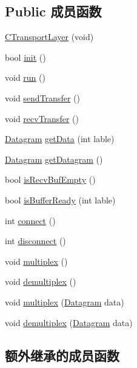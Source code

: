 \subsection*{Public 成员函数}
\begin{DoxyCompactItemize}
\item 
\hyperlink{class_c_transport_layer_ac28ec2550ebfcb876e31264f65d1e8d6}{C\+Transport\+Layer} (void)
\item 
bool \hyperlink{class_c_transport_layer_ac81e9405db824a73a6092ed0b05a217b}{init} ()
\item 
void \hyperlink{class_c_transport_layer_a60d1d41f33c5662eb9c1bbd1c8aa4dc3}{run} ()
\item 
void \hyperlink{class_c_transport_layer_a5755c5d7f4158bb08303b98042b24ca1}{send\+Transfer} ()
\item 
void \hyperlink{class_c_transport_layer_ad30133ccd6047d127d5a9feec593877d}{recv\+Transfer} ()
\item 
\hyperlink{class_datagram}{Datagram} \hyperlink{class_c_transport_layer_a9396850eb026ff070c06bfc25dd4979c}{get\+Data} (int lable)
\item 
\hyperlink{class_datagram}{Datagram} \hyperlink{class_c_transport_layer_a6ee36bbbfab91014087ed88923129372}{get\+Datagram} ()
\item 
bool \hyperlink{class_c_transport_layer_a18cba0784dba2a15f051be2c1163c278}{is\+Recv\+Buf\+Empty} ()
\item 
bool \hyperlink{class_c_transport_layer_aace17995c3cff74c756ecdb2a2e8cf43}{is\+Buffer\+Ready} (int lable)
\item 
int \hyperlink{class_c_transport_layer_a5830c0965a4a9501ffb33ae8d2acb58b}{connect} ()
\item 
int \hyperlink{class_c_transport_layer_a603dcfda4b1ef7dfb58c922cd8fd59bb}{disconnect} ()
\item 
void \hyperlink{class_c_transport_layer_abce8f3ca4b9c4d5c957b0f7b6746f289}{multiplex} ()
\item 
void \hyperlink{class_c_transport_layer_a3cbec0cdcdcf91df91ae7c708d8a414c}{demultiplex} ()
\item 
void \hyperlink{class_c_transport_layer_aa5d4c185f3a0f9c968d51caf46f7332e}{multiplex} (\hyperlink{class_datagram}{Datagram} data)
\item 
void \hyperlink{class_c_transport_layer_a316dd2a423992b04d77d42198c4e421c}{demultiplex} (\hyperlink{class_datagram}{Datagram} data)
\end{DoxyCompactItemize}
\subsection*{额外继承的成员函数}


